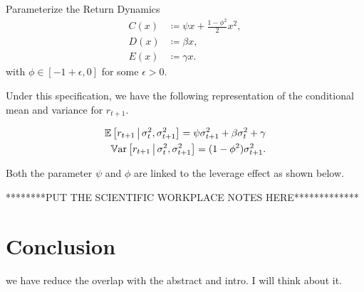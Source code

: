 \documentclass[11pt, letterpaper, twoside]{article}
\begin{document}
\begin{defn}{Parameterize the Return Dynamics}
    \label{defn:physical_return_dynamics}
    \begin{align}
        C(x) &\coloneqq \psi x + \frac{1 - \phi^2}{2} x^2,\\
        D(x) &\coloneqq \beta x, \\
        E(x) &\coloneqq \gamma x.
    \end{align}
with $\phi \in [-1+\epsilon, 0]$ for some $\epsilon>0$.
\end{defn}



Under this specification, we have the following representation of the conditional mean and variance for $r_{t+1}$.

\begin{remark} 
	\label{remark:return_moment_conditions}
	\begin{align}
		\label{eqn:rtn_cond_mean}
		\operatorname{\mathbb{E}}\left[r_{t+1} \,\middle\vert\, \sigma^2_t, \sigma^2_{t+1}\right] = \psi \sigma^2_{t+1} + \beta \sigma^2_t + \gamma \\
		\label{eqn:rtn_cond_vol}
		\operatorname{\mathbb{V}ar}\left[r_{t+1} \,\middle\vert\, \sigma^2_t, \sigma^2_{t+1}\right] = (1 - \phi^2) \sigma^2_{t+1}.
	\end{align}
\end{remark}


Both the parameter $\psi$ and $\phi$ are linked to the leverage effect as shown below.

********PUT THE SCIENTIFIC WORKPLACE NOTES HERE*************


\section{Conclusion}

we have reduce the overlap with the abstract and intro. I will think about it.
\end{document}
